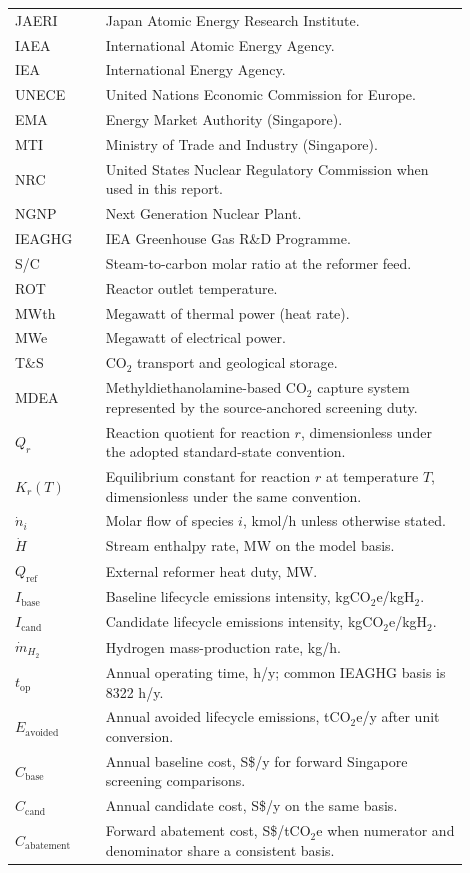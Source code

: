 \begin{longtable}{p{0.18\linewidth}p{0.72\linewidth}}
JAERI & Japan Atomic Energy Research Institute. \\
IAEA & International Atomic Energy Agency. \\
IEA & International Energy Agency. \\
UNECE & United Nations Economic Commission for Europe. \\
EMA & Energy Market Authority (Singapore). \\
MTI & Ministry of Trade and Industry (Singapore). \\
NRC & United States Nuclear Regulatory Commission when used in this report. \\
NGNP & Next Generation Nuclear Plant. \\
IEAGHG & IEA Greenhouse Gas R\&D Programme. \\
S/C & Steam-to-carbon molar ratio at the reformer feed. \\
ROT & Reactor outlet temperature. \\
MWth & Megawatt of thermal power (heat rate). \\
MWe & Megawatt of electrical power. \\
T\&S & CO$_2$ transport and geological storage. \\
MDEA & Methyldiethanolamine-based CO$_2$ capture system represented by the source-anchored screening duty. \\
$Q_r$ & Reaction quotient for reaction $r$, dimensionless under the adopted standard-state convention. \\
$K_r(T)$ & Equilibrium constant for reaction $r$ at temperature $T$, dimensionless under the same convention. \\
$\dot n_i$ & Molar flow of species $i$, kmol/h unless otherwise stated. \\
$\dot H$ & Stream enthalpy rate, MW on the model basis. \\
$Q_{\mathrm{ref}}$ & External reformer heat duty, MW. \\
$I_{\mathrm{base}}$ & Baseline lifecycle emissions intensity, kgCO$_2$e/kgH$_2$. \\
$I_{\mathrm{cand}}$ & Candidate lifecycle emissions intensity, kgCO$_2$e/kgH$_2$. \\
$\dot m_{H_2}$ & Hydrogen mass-production rate, kg/h. \\
$t_{\mathrm{op}}$ & Annual operating time, h/y; common IEAGHG basis is 8322 h/y. \\
$E_{\mathrm{avoided}}$ & Annual avoided lifecycle emissions, tCO$_2$e/y after unit conversion. \\
$C_{\mathrm{base}}$ & Annual baseline cost, S\$/y for forward Singapore screening comparisons. \\
$C_{\mathrm{cand}}$ & Annual candidate cost, S\$/y on the same basis. \\
$C_{\mathrm{abatement}}$ & Forward abatement cost, S\$/tCO$_2$e when numerator and denominator share a consistent basis. \\
\bottomrule
\end{longtable}
